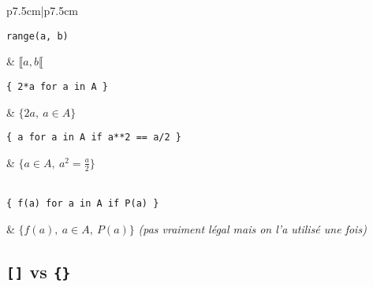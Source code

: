 \documentclass{article}
\begin{document}
\begin{table}[h]
	\centering
	\begin{tabular}{p{7.5cm}|p{7.5cm}}
\begin{minipage}{0.5\linewidth}
\begin{verbatim}
range(a, b)
\end{verbatim}
\end{minipage}
       & $\llbracket a, b \llbracket$ \\

\begin{minipage}{0.5\linewidth}
\begin{verbatim}
{ 2*a for a in A }
\end{verbatim}
\end{minipage}
       & $ \{2a,\ a \in A\}$ \\
\begin{minipage}{0.5\linewidth}
\begin{verbatim}
{ a for a in A if a**2 == a/2 }
\end{verbatim}
\end{minipage}
       & $ \{a \in A,\ a^2 = \frac{a}{2}\}$ \\
 \\

\begin{minipage}{0.5\linewidth}
\begin{verbatim}
{ f(a) for a in A if P(a) }
\end{verbatim}
\end{minipage}
       & $ \{f(a),\ a \in A,\ P(a)\}$ \emph{(pas vraiment légal mais on l'a utilisé une fois)}  \\
\end{tabular}
\end{table}

\subsection{\texttt{[]} vs \texttt{\{\}}}
\end{document}
